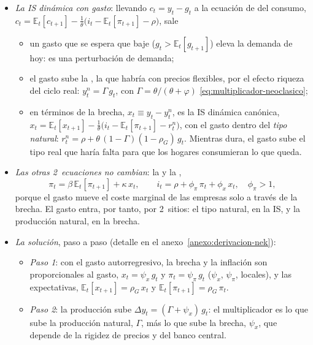 \documentclass[11pt]{article}
\begin{document}
\begin{itemize}
\item \emph{La IS dinámica con gasto}: llevando $c_t=y_t-g_t$ a la ecuación de  del consumo, $c_t=\mathbb{E}_t[c_{t+1}]-\frac{1}{\theta}\big(i_t-\mathbb{E}_t[\pi_{t+1}]-\rho\big)$, sale
  \begin{itemize}
  \item un gasto que se espera que baje ($g_t>\mathbb{E}_t[g_{t+1}]$) eleva la demanda de hoy: es una perturbación de demanda;
  \item el gasto sube la , la que habría con precios flexibles, por el efecto riqueza del ciclo real: $y^n_t=\Gamma\,g_t$, con $\Gamma=\theta/(\theta+\varphi)$ \eqref{eq:multiplicador-neoclasico};
  \item en términos de la brecha, $x_t\equiv y_t-y^n_t$, es la IS dinámica canónica, $x_t=\mathbb{E}_t[x_{t+1}]-\frac{1}{\theta}\big(i_t-\mathbb{E}_t[\pi_{t+1}]-r^n_t\big)$, con el gasto dentro del \emph{tipo natural}: $r^n_t=\rho+\theta\,(1-\Gamma)(1-\rho_G)\,g_t$. Mientras dura, el gasto sube el tipo real que haría falta para que los hogares consumieran lo que queda.
  \end{itemize}
\item \emph{Las otras 2~ecuaciones no cambian}: la  y la   ,
  \begin{equation}
  \pi_t=\beta\,\mathbb{E}_t[\pi_{t+1}]+\kappa\,x_t,\qquad i_t=\rho+\phi_\pi\,\pi_t+\phi_x\,x_t,\quad\phi_\pi>1, \label{eq:nkpc-taylor-gasto}
  \end{equation}
  porque el gasto mueve el coste marginal de las empresas solo a través de la brecha. El gasto entra, por tanto, por 2~sitios: el tipo natural, en la IS, y la producción natural, en la brecha.
\item \emph{La solución}, paso a paso (detalle en el anexo~\ref{anexo:derivacion-nek}):
  \begin{itemize}
  \item \emph{Paso 1}: con el gasto autorregresivo, la brecha y la inflación son proporcionales al gasto, $x_t=\psi_x\,g_t$ y $\pi_t=\psi_\pi\,g_t$ ($\psi_x$, $\psi_\pi$, locales), y las expectativas, $\mathbb{E}_t[x_{t+1}]=\rho_G\,x_t$ y $\mathbb{E}_t[\pi_{t+1}]=\rho_G\,\pi_t$.
  \item \emph{Paso 2}: la producción sube $\Delta y_t=(\Gamma+\psi_x)\,g_t$: el multiplicador es lo que sube la producción natural, $\Gamma$, más lo que sube la brecha, $\psi_x$, que depende de la rigidez de precios y del banco central.

\end{itemize}
\end{itemize}
\end{document}
